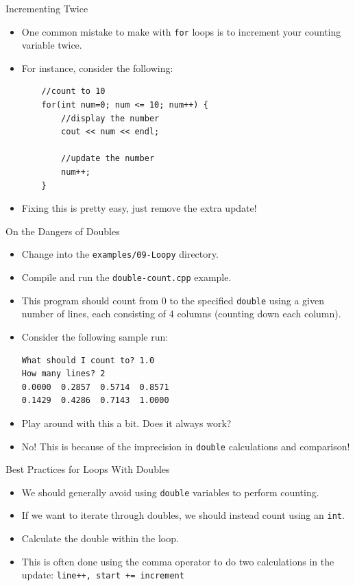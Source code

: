 \documentclass[]{beamer}
\begin{document}
\begin{frame}[fragile]{Incrementing Twice}
    \begin{itemize}[<+->]
        \item One common mistake to make with \texttt{for} loops is to
            increment your counting variable twice.
        \item For instance, consider the following:
        \begin{BVerbatim}
    //count to 10
    for(int num=0; num <= 10; num++) {
        //display the number
        cout << num << endl;

        //update the number
        num++;
    }
        \end{BVerbatim}
        \item Fixing this is pretty easy, just remove the extra
        update!
    \end{itemize}
\end{frame}

\begin{frame}[fragile]{On the Dangers of Doubles}
    \begin{itemize}[<+->]
        \item Change into the \texttt{examples/09-Loopy} directory.
        \item Compile and run the \texttt{double-count.cpp} example.
        \item This program should count from 0 to the specified
            \texttt{double} using a given number of lines, each
            consisting of 4 columns (counting down each column).
        \item Consider the following sample run:
\begin{BVerbatim}
What should I count to? 1.0
How many lines? 2
0.0000  0.2857  0.5714  0.8571  
0.1429  0.4286  0.7143  1.0000
\end{BVerbatim}
        \item Play around with this a bit. Does it always work?
        \item No!  This is because of the imprecision in
            \texttt{double} calculations and comparison!
    \end{itemize}
\end{frame}

\begin{frame}[fragile]{Best Practices for Loops With Doubles}
    \begin{itemize}[<+->]
        \item We should generally avoid using \texttt{double}
            variables to perform counting.
        \item If we want to iterate through doubles, we should instead
            count using an \texttt{int}. 
        \item Calculate the double within the loop.
        \item This is often done using the comma operator to do two
            calculations in the update:
            \newline\verb#line++, start += increment#
    \end{itemize}
\end{frame}
\end{document}
